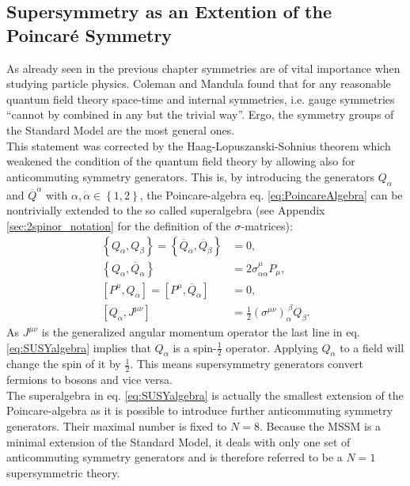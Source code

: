 \subsection{Supersymmetry as an Extention of the Poincaré Symmetry}\label{sec:SUSYalgebra}
As already seen in the previous chapter symmetries are of vital importance when studying particle physics. Coleman and Mandula \cite{Coleman:1967ad} found that for any reasonable quantum field theory space-time and internal symmetries, i.e. gauge symmetries ``cannot by combined in any but the trivial way''\cite{Pelc:1996vg}. Ergo, the symmetry groups of the Standard Model are the most general ones.\\
This statement was corrected by the Haag-Lopuszanski-Sohnius theorem \cite{Haag:1974qh} which weakened the condition of the quantum field theory by allowing also for anticommuting symmetry generators. This is, by introducing the generators $Q_\alpha$ and $\overline{Q}^{\dot{\alpha}}$ with $\alpha, \dot{\alpha} \in \left\{ 1,2 \right\}$, the Poincare-algebra eq. \eqref{eq:PoincareAlgebra} can be nontrivially extended to the so called superalgebra (see Appendix \eqref{sec:2spinor_notation} for the definition of the $\sigma$-matrices):
\begin{align}
\left\{Q_\alpha,Q_\beta\right\} = \left\{\overline{Q}_{\dot{\alpha}},\overline{Q}_{\dot{\beta}}\right\} &= 0,  \nonumber\\
\left\{Q_\alpha,\overline{Q}_{\dot{\alpha}}\right\} &= 2\sigma^\mu_{\alpha\dot{\alpha}} P_\mu, \nonumber\\
[P^\mu,Q_\alpha] = [P^\mu,\overline{Q}_{\dot{\alpha}}] &= 0, \nonumber \\
[Q_\alpha, J^{\mu\nu}] &= \frac{1}{2} (\sigma^{\mu\nu})_\alpha^{\ \beta} Q_\beta.\label{eq:SUSYalgebra}
\end{align}
As $J^{\mu\nu}$ is the generalized angular momentum operator the last line in eq. \eqref{eq:SUSYalgebra} implies that $Q_\alpha$ is a spin-$\frac{1}{2}$ operator. Applying $Q_\alpha$ to a field will change the spin of it by $\frac{1}{2}$. This means supersymmetry generators convert fermions to bosons and vice versa.\\
The superalgebra in eq. \eqref{eq:SUSYalgebra} is actually the smallest extension of the Poincare-algebra as it is possible to introduce further anticommuting symmetry generators. Their maximal number is fixed to $N = 8$. Because the MSSM is a minimal extension of the Standard Model, it deals with only one set of anticommuting symmetry generators and is therefore referred to be a $N = 1$ supersymmetric theory.\\
